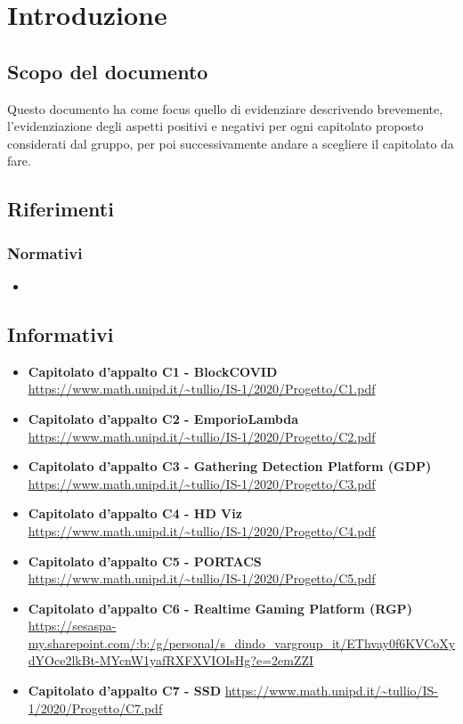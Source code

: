 \section{Introduzione}

	\subsection{Scopo del documento}
	Questo documento ha come focus quello di evidenziare descrivendo brevemente, l'evidenziazione degli aspetti positivi e negativi per ogni capitolato proposto considerati dal gruppo, per poi successivamente andare a scegliere il capitolato da fare.

	\subsection{Riferimenti}
		\subsubsection{Normativi}
		\begin{itemize}
			\item\textbf{}
		\end{itemize}
		
		\subsection{Informativi}
		\begin{itemize}
			\item\textbf{Capitolato d'appalto C1 - BlockCOVID}
			\url{https://www.math.unipd.it/~tullio/IS-1/2020/Progetto/C1.pdf}
			
			\item\textbf{Capitolato d'appalto C2 - EmporioLambda}
			\url{https://www.math.unipd.it/~tullio/IS-1/2020/Progetto/C2.pdf}
			
			\item\textbf{Capitolato d'appalto C3 - Gathering Detection Platform (GDP)}
			\url{https://www.math.unipd.it/~tullio/IS-1/2020/Progetto/C3.pdf}
			
			\item\textbf{Capitolato d'appalto C4 - HD Viz}
			\url{https://www.math.unipd.it/~tullio/IS-1/2020/Progetto/C4.pdf}
			
			\item\textbf{Capitolato d'appalto C5 - PORTACS}
			\url{https://www.math.unipd.it/~tullio/IS-1/2020/Progetto/C5.pdf}
			
			\item\textbf{Capitolato d'appalto C6 - Realtime Gaming Platform (RGP)}
			\url{https://sesaspa-my.sharepoint.com/:b:/g/personal/s_dindo_vargroup_it/EThvay0f6KVCoXydYOce2lkBt-MYcnW1yafRXFXVIOIsHg?e=2emZZI}
			
			\item\textbf{Capitolato d'appalto C7 - SSD}
			\url{https://www.math.unipd.it/~tullio/IS-1/2020/Progetto/C7.pdf}
		\end{itemize}